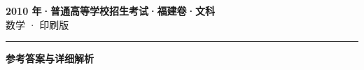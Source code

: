 \documentclass[zihao=5, a4paper]{ctexart}
\begin{document}
\begin{center}
  {\Large\bfseries 2010 年·普通高等学校招生考试·福建卷·文科}\\[4pt]
  {\large 数学 · 印刷版}
\end{center}
\medskip
{}

\par\bigskip\hrule\bigskip
{}
\begin{center}{\large\bfseries 参考答案与详细解析}\end{center}
\smallskip

\end{document}
